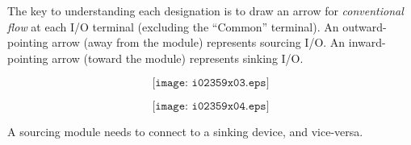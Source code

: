 \vskip 10pt

The key to understanding each designation is to draw an arrow for {\it conventional flow} at each I/O terminal (excluding the ``Common'' terminal).  An outward-pointing arrow (away from the module) represents sourcing I/O.  An inward-pointing arrow (toward the module) represents sinking I/O.

$$\texttt{[image: i02359x03.eps]}$$

$$\texttt{[image: i02359x04.eps]}$$

\vskip 10pt

A sourcing module needs to connect to a sinking device, and vice-versa.




